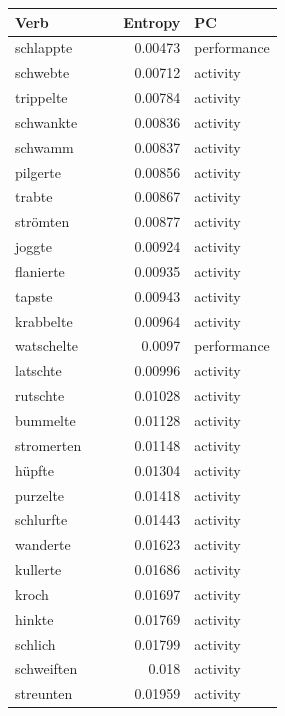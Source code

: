 \begin{table}[h!]
    \centering
    \begin{tabular}[t]{|l|c|c|r|l|}
        \hline
        \textbf{Verb} & & & \textbf{Entropy} & \textbf{PC} \\
        \hline
        schlappte &  &  & 0.00473 & performance\\
        schwebte &  &  & 0.00712 & activity\\
        trippelte &  &  & 0.00784 & activity\\
        schwankte &  &  & 0.00836 & activity\\
        schwamm &  &  & 0.00837 & activity\\
        pilgerte &  &  & 0.00856 & activity\\
        trabte &  &  & 0.00867 & activity\\
        strömten &  &  & 0.00877 & activity\\
        joggte &  &  & 0.00924 & activity\\
        flanierte &  &  & 0.00935 & activity\\
        tapste &  &  & 0.00943 & activity\\
        krabbelte &  &  & 0.00964 & activity\\
        watschelte &  &  & 0.0097 & performance\\
        latschte &  &  & 0.00996 & activity\\
        rutschte &  &  & 0.01028 & activity\\
        bummelte &  &  & 0.01128 & activity\\
        stromerten &  &  & 0.01148 & activity\\
        hüpfte &  &  & 0.01304 & activity\\
        purzelte &  &  & 0.01418 & activity\\
        schlurfte &  &  & 0.01443 & activity\\
        wanderte &  &  & 0.01623 & activity\\
        kullerte &  &  & 0.01686 & activity\\
        kroch &  &  & 0.01697 & activity\\
        hinkte &  &  & 0.01769 & activity\\
        schlich &  &  & 0.01799 & activity\\
        schweiften &  &  & 0.018 & activity\\
        streunten &  &  & 0.01959 & activity\\

\end{tabular}
\end{table}
